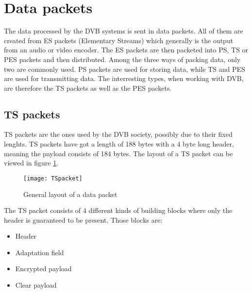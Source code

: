 \section{Data packets}\label{sec:Data}
The data processed by the DVB systems is sent in data packets. All of them are 
created from ES packets (Elementary Streams) which generally is the output from 
an audio or video encoder. The ES packets are then packeted into PS, TS or PES 
packets and then distributed. Among the three ways of packing data, only two are 
commonly used. PS packets are used for storing data, while TS and PES are used 
for transmitting data. The interresting types, when working with DVB, are 
therefore the TS packets as well as the PES packets.

\subsection{TS packets}
TS packets are the ones used by the DVB society, possibly due to their fixed 
lenghts. TS packets have got a length of 188 bytes with a 4 byte long header, 
meaning the payload consists of 184 bytes. The layout of a TS packet can be 
viewed in figure \ref{img:Package}.

\begin{figure}
  \texttt{[image: TSpacket]}
  \caption{General layout of a data packet \citep{DVB:2013}}
  \label{img:Package}
\end{figure}

The TS packet consists of 4 different kinds of building blocks where only the 
header is guaranteed to be present. Those blocks are:

\begin{itemize}
\item Header
\item Adaptation field
\item Encrypted payload
\item Clear payload
\end{itemize}

